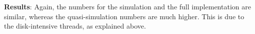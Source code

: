 \documentclass{report}
\begin{document}
\textbf{Results}: Again, the numbers for the simulation and the full
implementation are similar, whereas the quasi-simulation numbers are much
higher.  This is due to the disk-intensive threads, as explained above.







\end{document}
